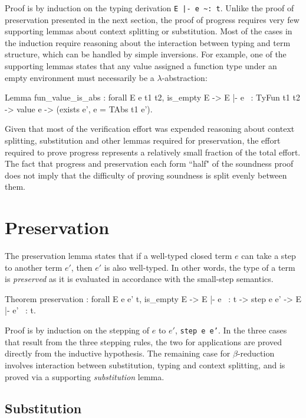 \documentclass[]{unswthesis}
\let\c\texttt
\let\i\textit
\begin{document}
Proof is by induction on the typing derivation \c{E |- e \textasciitilde: t}. Unlike the proof of preservation presented in the next section, the proof of progress requires very few supporting lemmas about context splitting or substitution. Most of the cases in the induction require reasoning about the interaction between typing and term structure, which can be handled by simple inversions. For example, one of the supporting lemmas states that any value assigned a function type under an empty environment must necessarily be a $\lambda$-abstraction:

\begin{coqcode}
Lemma fun_value_is_abs : forall E e t1 t2,
  is_empty E ->
  E |- e ~: TyFun t1 t2 ->
  value e ->
  (exists e', e = TAbs t1 e').
\end{coqcode}

Given that most of the verification effort was expended reasoning about context splitting, substitution and other lemmas required for preservation, the effort required to prove progress represents a relatively small fraction of the total effort. The fact that progress and preservation each form ``half" of the soundness proof does not imply that the difficulty of proving soundness is split evenly between them.

\section{Preservation}
\label{sec:preservation}

The preservation lemma states that if a well-typed closed term $e$ can take a step to another term $e'$, then $e'$ is also well-typed. In other words, the type of a term is \i{preserved} as it is evaluated in accordance with the small-step semantics.

\newpage
\begin{coqcode}
Theorem preservation : forall E e e' t,
  is_empty E ->
  E |- e ~: t ->
  step e e' ->
  E |- e' ~: t.
\end{coqcode}

Proof is by induction on the stepping of $e$ to $e'$, \c{step e e'}. In the three cases that result from the three stepping rules, the two for applications are proved directly from the inductive hypothesis. The remaining case for $\beta$-reduction involves interaction between substitution, typing and context splitting, and is proved via a supporting \i{substitution} lemma.

\subsection{Substitution}
\label{sec:subst}
\end{document}
